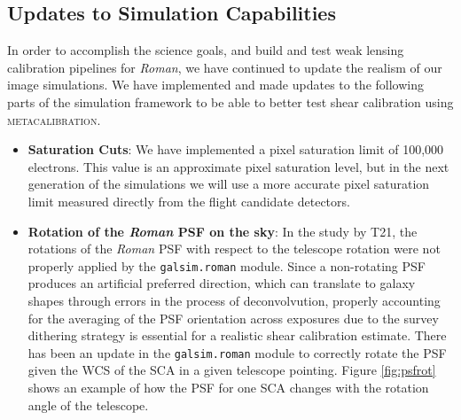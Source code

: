 \documentclass[fleqn,usenatbib]{mnras}
\begin{document}
\subsection{Updates to Simulation Capabilities}
In order to accomplish the science goals, and build and test weak lensing calibration pipelines for \emph{Roman}, we have continued to update the realism of our image simulations. We have implemented and made updates to the following parts of the simulation framework to be able to better test shear calibration using \textsc{metacalibration}. 
\begin{itemize}
    \setlength\itemsep{1em}
    \item \textbf{Saturation Cuts}:
    We have implemented a pixel saturation limit of 100,000 electrons. This value is an approximate pixel saturation level, but in the next generation of the simulations we will use a more accurate pixel saturation limit measured directly from the flight candidate detectors. 
    
    \item \textbf{Rotation of the \emph{Roman} PSF on the sky}:
    In the study by T21, the rotations of the \emph{Roman} PSF with respect to the telescope rotation were not properly applied by the \texttt{galsim.roman} module. Since a non-rotating PSF produces an artificial preferred direction, which can translate to galaxy shapes through errors in the process of deconvolvution, properly accounting for the averaging of the PSF orientation across exposures due to the survey dithering strategy is essential for a realistic shear calibration estimate. There has been an update in the \texttt{galsim.roman} module to correctly rotate the PSF given the WCS of the SCA in a given telescope pointing. Figure \ref{fig:psfrot} shows an example of how the PSF for one SCA changes with the rotation angle of the telescope.
    

\end{itemize}
\end{document}
